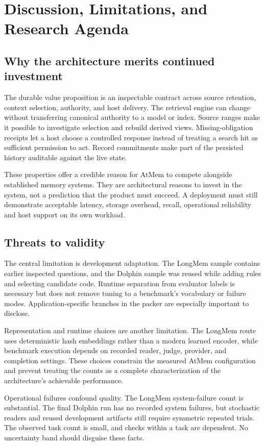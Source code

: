 \documentclass[11pt]{article}
\begin{document}
\section{Discussion, Limitations, and Research Agenda}
\subsection{Why the architecture merits continued investment}
The durable value proposition is an inspectable contract across source retention, context selection, authority, and host delivery. The retrieval engine can change without transferring canonical authority to a model or index. Source ranges make it possible to investigate selection and rebuild derived views. Missing-obligation receipts let a host choose a controlled response instead of treating a search hit as sufficient permission to act. Record commitments make part of the persisted history auditable against the live state.

These properties offer a credible reason for AtMem to compete alongside established memory systems. They are architectural reasons to invest in the system, not a prediction that the product must succeed. A deployment must still demonstrate acceptable latency, storage overhead, recall, operational reliability and host support on its own workload.

\subsection{Threats to validity}
The central limitation is development adaptation. The LongMem sample contains earlier inspected questions, and the Dolphin sample was reused while adding rules and selecting candidate code. Runtime separation from evaluator labels is necessary but does not remove tuning to a benchmark's vocabulary or failure modes. Application-specific branches in the packer are especially important to disclose.

Representation and runtime choices are another limitation. The LongMem route uses deterministic hash embeddings rather than a modern learned encoder, while benchmark execution depends on recorded reader, judge, provider, and completion settings. These choices constrain the measured AtMem configuration and prevent treating the counts as a complete characterization of the architecture's achievable performance.

Operational failures confound quality. The LongMem system-failure count is substantial. The final Dolphin run has no recorded system failures, but stochastic readers and reused development artifacts still require symmetric repeated trials. The observed task count is small, and checks within a task are dependent. No uncertainty band should disguise these facts.
\end{document}
